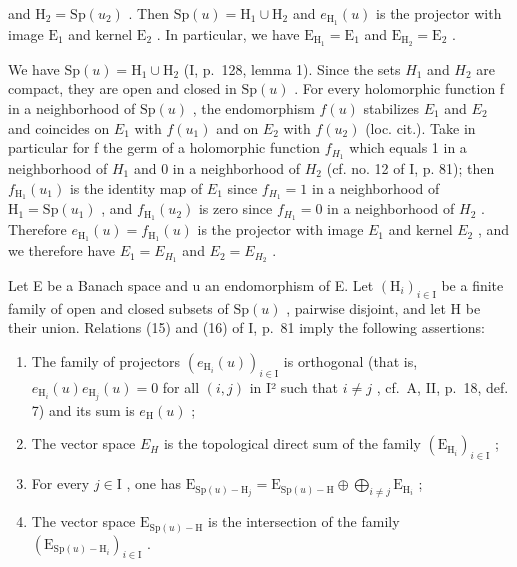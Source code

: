and \(\mathrm{H}_2 = \mathrm{Sp}(u_2)\) . Then \(\mathrm{Sp}(u) = \mathrm{H}_1 \cup \mathrm{H}_2\) and \(e_{\mathrm{H}_1}(u)\) is the projector with image \(\mathrm{E}_1\) and kernel \(\mathrm{E}_2\) . In particular, we have \(\mathrm{E}_{\mathrm{H}_1} = \mathrm{E}_1\) and \(\mathrm{E}_{\mathrm{H}_2} = \mathrm{E}_2\) .

We have \(\mathrm{Sp}(u)=\mathrm{H}_{1}\cup\mathrm{H}_{2}\) (I, p.~128, lemma 1). Since the sets \(H_{1}\) and \(H_{2}\) are compact, they are open and closed in \(\mathrm{Sp}(u)\) . For every holomorphic function f in a neighborhood of \(\mathrm{Sp}(u)\) , the endomorphism \(f(u)\) stabilizes \(E_{1}\) and \(E_{2}\) and coincides on \(E_{1}\) with \(f(u_{1})\) and on \(E_{2}\) with \(f(u_{2})\) (loc. cit.). Take in particular for f the germ of a holomorphic function \(f_{H_{1}}\) which equals 1 in a neighborhood of \(H_{1}\) and 0 in a neighborhood of \(H_{2}\) (cf. no. 12 of I, p. 81); then \(f_{\mathrm{H}_{1}}(u_{1})\) is the identity map of \(E_{1}\) since \(f_{H_{1}}=1\) in a neighborhood of \(\mathrm{H}_{1}=\mathrm{Sp}(u_{1})\) , and \(f_{\mathrm{H}_{1}}(u_{2})\) is zero since \(f_{H_{1}}=0\) in a neighborhood of \(H_{2}\) . Therefore \(e_{\mathrm{H}_{1}}(u)=f_{\mathrm{H}_{1}}(u)\) is the projector with image \(E_{1}\) and kernel \(E_{2}\) , and we therefore have \(E_{1}=E_{H_{1}}\) and \(E_{2}=E_{H_{2}}\) .

Let E be a Banach space and u an endomorphism of E. Let \((\mathrm{H}_{i})_{i\in\mathrm{I}}\) be a finite family of open and closed subsets of \(\mathrm{Sp}(u)\) , pairwise disjoint, and let H be their union. Relations (15) and (16) of I, p.~81 imply the following assertions:

\begin{enumerate}
\def\labelenumi{\alph{enumi})}
\item
  The family of projectors \((e_{\mathrm{H}_{i}}(u))_{i\in\mathrm{I}}\) is orthogonal (that is, \(e_{\mathrm{H}_{i}}(u)e_{\mathrm{H}_{j}}(u)=0\) for all \((i,j)\) in I² such that \(i\neq j\) , cf.~A, II, p.~18, def. 7) and its sum is \(e_{\mathrm{H}}(u)\) ;
\item
  The vector space \(E_{H}\) is the topological direct sum of the family \((\mathrm{E}_{\mathrm{H}_{i}})_{i\in\mathrm{I}}\) ;
\item
  For every \(j \in \mathrm{I}\) , one has \(\mathrm{E}_{\mathrm{Sp}(u) - \mathrm{H}_j} = \mathrm{E}_{\mathrm{Sp}(u) - \mathrm{H}} \oplus \bigoplus_{i \neq j} \mathrm{E}_{\mathrm{H}_i}\) ;
\item
  The vector space \(\mathrm{E}_{\mathrm{Sp}(u)-\mathrm{H}}\) is the intersection of the family \((\mathrm{E}_{\mathrm{Sp}(u)-\mathrm{H}_i})_{i\in\mathrm{I}}\) .
\end{enumerate}

